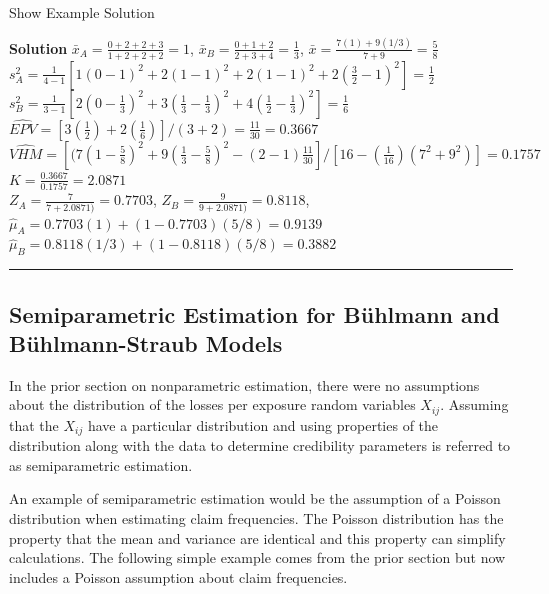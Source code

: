 \documentclass[]{book}
\theoremstyle{definition}
\theoremstyle{definition}
\theoremstyle{definition}
\theoremstyle{remark}
\begin{document}
Show Example Solution

\hypertarget{toggleExampleCred.6.3}{}
\textbf{Solution} \(\bar{x}_A=\frac{0+2+2+3}{1+2+2+2}=1\),
\(\bar{x}_B=\frac{0+1+2}{2+3+4}=\frac{1}{3}\),
\(\bar{x}=\frac{7(1)+9(1/3)}{7+9}=\frac{5}{8}\)\\
\(s_A^2=\frac{1}{4-1}\left[1(0-1)^2+2(1-1)^2+2(1-1)^2+2(\frac{3}{2}-1)^2\right]=\frac{1}{2 }\)\\
\(s_B^2=\frac{1}{3-1}\left[2(0-\frac{1}{3})^2+3(\frac{1}{3}-\frac{1}{3})^2+4(\frac{1}{2}-\frac{1}{3})^2\right]=\frac{1}{6}\)\\
\(\widehat{EPV}=\left[3\left(\frac{1}{2}\right)+2\left(\frac{1}{6}\right)\right]/(3+2)=\frac{11}{30}=0.3667\)\\
\(\widehat{VHM}=\left[(7(1-\frac{5}{8})^2+9(\frac{1}{3}-\frac{5}{8})^2-(2-1)\frac{11}{30}\right]/\left[16-\left(\frac{1}{16}\right)(7^2+9^2)\right]=0.1757\)\\
\(K=\frac{0.3667}{0.1757}=2.0871\)\\
\(Z_A=\frac{7}{7+2.0871)}=0.7703\),
\(Z_B=\frac{9}{9+2.0871)}=0.8118\),\\
\(\hat{\mu}_A=0.7703(1)+(1-0.7703)(5/8)=0.9139\)\\
\(\hat{\mu}_B=0.8118(1/3)+(1-0.8118)(5/8)=0.3882\)

\begin{center}\rule{0.5\linewidth}{\linethickness}\end{center}

\subsection{Semiparametric Estimation for Bühlmann and Bühlmann-Straub
Models}\label{semiparametric-estimation-for-buhlmann-and-buhlmann-straub-models}

In the prior section on nonparametric estimation, there were no
assumptions about the distribution of the losses per exposure random
variables \(X_{ij}\). Assuming that the \(X_{ij}\) have a particular
distribution and using properties of the distribution along with the
data to determine credibility parameters is referred to as
semiparametric estimation.

An example of semiparametric estimation would be the assumption of a
Poisson distribution when estimating claim frequencies. The Poisson
distribution has the property that the mean and variance are identical
and this property can simplify calculations. The following simple
example comes from the prior section but now includes a Poisson
assumption about claim frequencies.
\end{document}
